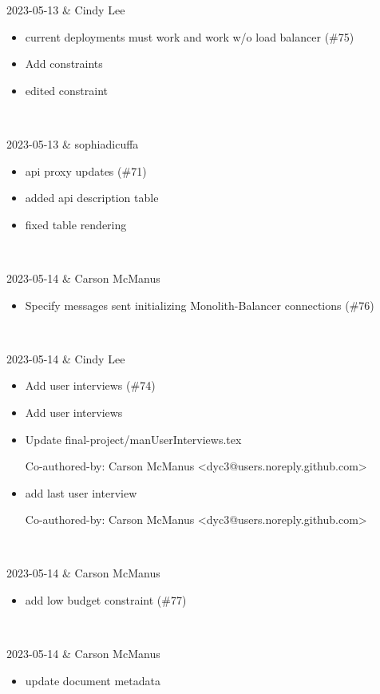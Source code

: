 2023-05-13 & Cindy Lee
\begin{itemize}[topsep=0pt,itemsep=0pt,parsep=0pt,partopsep=0pt,leftmargin=12pt]
\item current deployments must work and work w/o load balancer (\#75)

\item Add constraints

\item edited constraint
\end{itemize}
\\ \hline

2023-05-13 & sophiadicuffa
\begin{itemize}[topsep=0pt,itemsep=0pt,parsep=0pt,partopsep=0pt,leftmargin=12pt]
\item api proxy updates (\#71)

\item added api description table

\item fixed table rendering
\end{itemize}
\\ \hline

2023-05-14 & Carson McManus
\begin{itemize}[topsep=0pt,itemsep=0pt,parsep=0pt,partopsep=0pt,leftmargin=12pt]
\item Specify messages sent initializing Monolith-Balancer connections (\#76)


\end{itemize}
\\ \hline

2023-05-14 & Cindy Lee
\begin{itemize}[topsep=0pt,itemsep=0pt,parsep=0pt,partopsep=0pt,leftmargin=12pt]
\item Add user interviews (\#74)

\item Add user interviews

\item Update final-project/manUserInterviews.tex

Co-authored-by: Carson McManus <dyc3@users.noreply.github.com>

\item add last user interview



Co-authored-by: Carson McManus <dyc3@users.noreply.github.com>
\end{itemize}
\\ \hline

2023-05-14 & Carson McManus
\begin{itemize}[topsep=0pt,itemsep=0pt,parsep=0pt,partopsep=0pt,leftmargin=12pt]
\item add low budget constraint (\#77)


\end{itemize}
\\ \hline

2023-05-14 & Carson McManus
\begin{itemize}[topsep=0pt,itemsep=0pt,parsep=0pt,partopsep=0pt,leftmargin=12pt]
\item update document metadata

\end{itemize}
\\ \hline
